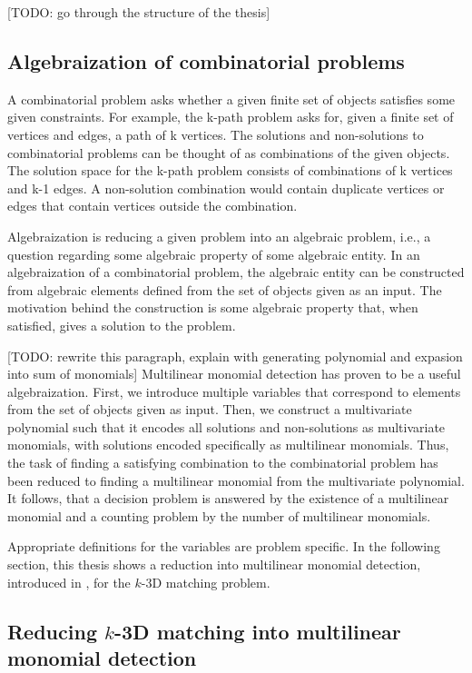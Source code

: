 [TODO: go through the structure of the thesis]

\subsection{Algebraization of combinatorial problems}

A combinatorial problem asks whether a given finite set of objects satisfies some given constraints. 
For example, the k-path problem asks for, given a finite set of vertices and edges, 
a path of k vertices. The solutions and non-solutions to combinatorial problems can be thought of as 
combinations of the given objects. The solution space for the k-path problem consists of combinations of k vertices and k-1 edges. 
A non-solution combination would contain duplicate vertices or edges that contain vertices outside the combination.\nl

Algebraization is reducing a given problem into an algebraic problem, i.e., a question regarding some algebraic property of some algebraic entity. 
In an algebraization of a combinatorial problem, the algebraic entity can be constructed from algebraic elements defined from the 
set of objects given as an input. The motivation behind the construction is some algebraic property that, 
when satisfied, gives a solution to the problem.\nl

[TODO: rewrite this paragraph, explain with generating polynomial and expasion into sum of monomials]
Multilinear monomial detection has proven to be a useful algebraization. First, we introduce multiple variables that 
correspond to elements from the set of objects given as input. Then, we construct a multivariate polynomial such that it 
encodes all solutions and non-solutions as multivariate monomials, with solutions encoded specifically as multilinear monomials. 
Thus, the task of finding a satisfying combination to the combinatorial problem has been reduced to 
finding a multilinear monomial from the multivariate polynomial. It follows, that a decision problem is answered by 
the existence of a multilinear monomial and a counting problem by the number of multilinear monomials.\nl

Appropriate definitions for the variables are problem specific. In the following section, this thesis shows a 
reduction into multilinear monomial detection, introduced in \cite{10.1145/2742544}, 
for the $k$-3D matching problem.

\subsection{Reducing $k$-3D matching into multilinear monomial detection}

